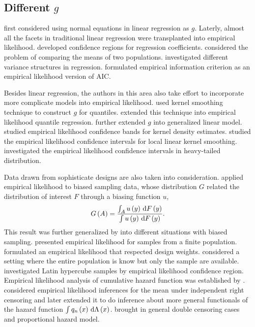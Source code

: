 \subsection{Different $g$ }

\citet{owen1991empirical} first considered using normal equations
in linear regression as $g$. Laterly, almost all the facets in traditional
linear regression were transplanted into empirical likelihood. \citet{chen1993accuracy,chen1994empirical}
developed confidence regions for regression coefficients. \citet{jing1995two,adimari1995empirical}
considered the problem of comparing the means of two populations.
\citet{davidian1987variance} investigated different variance structures
in regression. \citet{kolaczyk1995information} formulated empirical
information criterion as an empirical likelihood version of AIC. 

Besides linear regression, the authors in this area also take effort
to incorporate more complicate models into empirical likelihood. \citet{chen1993smoothed}
used kernel smoothing technique to construct $g$ for quantiles. \citet{whang2006smoothed}
extended this technique into empirical likelihood quantile regression.
\citet{kolaczyk1994empirical} further extended $g$ into generalized
linear model. \citet{hall1993empirical} studied empirical likelihood
confidence bands for kernel density estimates. \citet{chen2000empirical}
studied the empirical likelihood confidence intervals for local linear
kernel smoothing. \citet{peng2004empirical} investigated the empirical
likelihood confidence intervals in heavy-tailed distribution.

Data drawn from sophisticate designs are also taken into consideration.
\citet{qin1993empirical} applied empirical likelihood to biased sampling
data, whose distribution $G$ related the distribution of interest
$F$ through a biasing function $u$, 
\[
G\left(A\right)=\frac{\int_{A}u\left(y\right)\,\mathrm{d} F\left(y\right)}{\int u\left(y\right)\,\mathrm{d} F\left(y\right)}.
\]
This result was further generalized by \citet{qin1997goodness,qin1999empirical,qin1998semiparametric}
into different situations with biased sampling. \citet{chen1993empirical}
presented empirical likelihood for samples from a finite population.
\citet{chen1999pseudo} formulated an empirical likelihood that respected
design weights. \citet{wu2001model} considered a setting where the
entire population is know but only the sample are available. \citet{loh1996latin}
investigated Latin hypercube samples by empirical likelihood confidence
region. Empirical likelihood analysis of cumulative hazard function
was established by \citet{murphy1995likelihood}. \citet{adimari1997empirical}
considered empirical likelihood inferences for the mean under independent
right censoring and later \citet{pan2002empirical} extended it to
do inference about more general functionals of the hazard function
$\int q_{n}\left(x\right)\,\mathrm{d}\Lambda\left(x\right)$. \citet{murphy1997semiparametric}
brought in general double censoring cases and proportional hazard
model.

